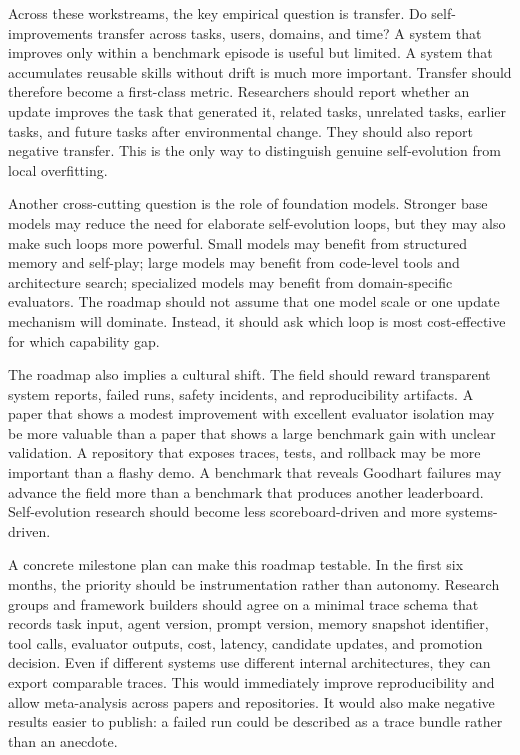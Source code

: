 Across these workstreams, the key empirical question is transfer. Do self-improvements transfer across tasks, users, domains, and time? A system that improves only within a benchmark episode is useful but limited. A system that accumulates reusable skills without drift is much more important. Transfer should therefore become a first-class metric. Researchers should report whether an update improves the task that generated it, related tasks, unrelated tasks, earlier tasks, and future tasks after environmental change. They should also report negative transfer. This is the only way to distinguish genuine self-evolution from local overfitting.

Another cross-cutting question is the role of foundation models. Stronger base models may reduce the need for elaborate self-evolution loops, but they may also make such loops more powerful. Small models may benefit from structured memory and self-play; large models may benefit from code-level tools and architecture search; specialized models may benefit from domain-specific evaluators. The roadmap should not assume that one model scale or one update mechanism will dominate. Instead, it should ask which loop is most cost-effective for which capability gap.

The roadmap also implies a cultural shift. The field should reward transparent system reports, failed runs, safety incidents, and reproducibility artifacts. A paper that shows a modest improvement with excellent evaluator isolation may be more valuable than a paper that shows a large benchmark gain with unclear validation. A repository that exposes traces, tests, and rollback may be more important than a flashy demo. A benchmark that reveals Goodhart failures may advance the field more than a benchmark that produces another leaderboard. Self-evolution research should become less scoreboard-driven and more systems-driven.


A concrete milestone plan can make this roadmap testable. In the first six months, the priority should be instrumentation rather than autonomy. Research groups and framework builders should agree on a minimal trace schema that records task input, agent version, prompt version, memory snapshot identifier, tool calls, evaluator outputs, cost, latency, candidate updates, and promotion decision. Even if different systems use different internal architectures, they can export comparable traces. This would immediately improve reproducibility and allow meta-analysis across papers and repositories. It would also make negative results easier to publish: a failed run could be described as a trace bundle rather than an anecdote.

